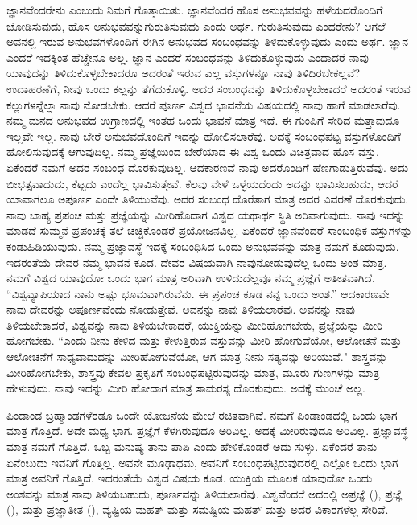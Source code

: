 ಜ್ಞಾನವೆಂದರೇನು ಎಂಬುದು ನಿಮಗೆ ಗೊತ್ತಾಯಿತು. ಜ್ಞಾನವೆಂದರೆ ಹೊಸ ಅನುಭವವನ್ನು ಹಳೆಯದರೊಂದಿಗೆ ಜೋಡಿಸುವುದು, ಹೊಸ ಅನುಭವವನ್ನು\break ಗುರುತಿಸುವುದು ಎಂದು ಅರ್ಥ. ಗುರುತಿಸುವುದು ಎಂದರೇನು? ಆಗಲೆ ಅವನಲ್ಲಿ ಇರುವ ಅನುಭವಗಳೊಂದಿಗೆ ಈಗಿನ ಅನುಭವದ ಸಂಬಂಧವನ್ನು ತಿಳಿದುಕೊಳ್ಳುವುದು ಎಂದು ಅರ್ಥ. ಜ್ಞಾನ ಎಂದರೆ ಇದಕ್ಕಿಂತ ಹೆಚ್ಚೇನೂ ಅಲ್ಲ. ಜ್ಞಾನ ಎಂದರೆ ಸಂಬಂಧವನ್ನು ತಿಳಿದುಕೊಳ್ಳುವುದು ಎಂದಾದರೆ ನಾವು ಯಾವುದನ್ನು ತಿಳಿದುಕೊಳ್ಳಬೇಕಾದರೂ ಅದರಂತೆ ಇರುವ ಎಲ್ಲ ವಸ್ತುಗಳನ್ನೂ ನಾವು ತಿಳಿದಿರಬೇಕಲ್ಲವೆ? ಉದಾಹರಣೆಗೆ, ನೀವು ಒಂದು ಕಲ್ಲನ್ನು ತೆಗೆದುಕೊಳ್ಳಿ. ಅದರ ಸಂಬಂಧವನ್ನು ತಿಳಿದುಕೊಳ್ಳಬೇಕಾದರೆ ಅದರಂತೆ ಇರುವ ಕಲ್ಲುಗಳನ್ನೆಲ್ಲಾ ನಾವು ನೋಡಬೇಕು. ಆದರೆ ಪೂರ್ಣ ವಿಶ್ವದ ಭಾವನೆಯ ವಿಷಯದಲ್ಲಿ ನಾವು ಹಾಗೆ ಮಾಡಲಾರೆವು. ನಮ್ಮ ಮನದ ಅನುಭವದ ಉಗ್ರಾಣದಲ್ಲಿ ಇಂತಹ ಒಂದು ಭಾವನೆ ಮಾತ್ರ ಇದೆ. ಈ ಗುಂಪಿಗೆ ಸೇರಿದ ಮತ್ತಾವುದೂ ಇಲ್ಲವೇ ಇಲ್ಲ. ನಾವು ಬೇರೆ ಅನುಭವದೊಂದಿಗೆ ಇದನ್ನು ಹೋಲಿಸಲಾರೆವು. ಅದಕ್ಕೆ ಸಂಬಂಧಪಟ್ಟ ವಸ್ತುಗಳೊಂದಿಗೆ ಹೋಲಿಸುವುದಕ್ಕೆ ಆಗುವುದಿಲ್ಲ. ನಮ್ಮ ಪ್ರಜ್ಞೆಯಿಂದ ಬೇರೆಯಾದ ಈ ವಿಶ್ವ ಒಂದು ವಿಚಿತ್ರವಾದ ಹೊಸ ವಸ್ತು. ಏಕೆಂದರೆ ನಮಗೆ ಅದರ ಸಂಬಂಧ ದೊರಕುವುದಿಲ್ಲ. ಆದಕಾರಣವೆ ನಾವು ಅದರೊಂದಿಗೆ ಹೆಣಗಾಡುತ್ತಿರುವೆವು. ಅದು ಬೀಭತ್ಸವಾದುದು, ಕೆಟ್ಟದು ಎಂದೆಲ್ಲ ಭಾವಿಸುತ್ತೇವೆ. ಕೆಲವು ವೇಳೆ ಒಳ್ಳೆಯದೆಂದು ಅದನ್ನು ಭಾವಿಸಬಹುದು, ಆದರೆ ಯಾವಾಗಲೂ ಅಪೂರ್ಣ ಎಂದೇ ತಿಳಿಯುವೆವು. ಅದರ ಸಂಬಂಧ ದೊರೆತಾಗ ಮಾತ್ರ ಅದರ ವಿವರಣೆ ದೊರಕುವುದು. ನಾವು ಬಾಹ್ಯ ಪ್ರಪಂಚ ಮತ್ತು ಪ್ರಜ್ಞೆಯನ್ನು ಮೀರಿಹೊದಾಗ ವಿಶ್ವದ ಯಥಾರ್ಥ ಸ್ಥಿತಿ ಅರಿವಾಗುವುದು. ನಾವು ಇದನ್ನು ಮಾಡದೆ ಸುಮ್ಮನೆ ಪ್ರಪಂಚಕ್ಕೆ ತಲೆ ಚಚ್ಚಿಕೊಂಡರೆ ಪ್ರಯೋಜನವಿಲ್ಲ. ಏಕೆಂದರೆ ಜ್ಞಾನವೆಂದರೆ ಸಾಂಬಂಧಿಕ ವಸ್ತುಗಳನ್ನು ಕಂಡುಹಿಡಿಯುವುದು. ನಮ್ಮ ಪ್ರಜ್ಞಾವಸ್ಥೆ ಇದಕ್ಕೆ ಸಂಬಂಧಿಸಿದ ಒಂದು ಅನುಭವವನ್ನು ಮಾತ್ರ ನಮಗೆ ಕೊಡುವುದು. ಇದರಂತೆಯೆ ದೇವರ ನಮ್ಮ ಭಾವನೆ ಕೂಡ. ದೇವರ ವಿಷಯವಾಗಿ ನಾವು\break ನೋಡುವುದೆಲ್ಲ ಒಂದು ಅಂಶ ಮಾತ್ರ. ನಮಗೆ ವಿಶ್ವದ ಯಾವುದೋ ಒಂದು ಭಾಗ ಮಾತ್ರ ಅರಿವಾಗಿ ಉಳಿದುದೆಲ್ಲವೂ ನಮ್ಮ ಪ್ರಜ್ಞೆಗೆ ಅತೀತವಾಗಿದೆ. “ವಿಶ್ವವ್ಯಾಪಿಯಾದ ನಾನು ಅಷ್ಟು ಭೂಮವಾಗಿರುವೆನು. ಈ ಪ್ರಪಂಚ ಕೂಡ ನನ್ನ ಒಂದು ಅಂಶ.'' ಆದಕಾರಣವೇ ನಾವು ದೇವರನ್ನು ಅಪೂರ್ಣವೆಂದು ನೋಡುತ್ತೇವೆ. ಅವನನ್ನು ನಾವು ತಿಳಿಯಲಾರೆವು. ಅವನನ್ನು ನಾವು ತಿಳಿಯಬೇಕಾದರೆ, ವಿಶ್ವವನ್ನು ನಾವು ತಿಳಿಯಬೇಕಾದರೆ, ಯುಕ್ತಿಯನ್ನು ಮೀರಿಹೋಗಬೇಕು, ಪ್ರಜ್ಞೆಯನ್ನು ಮೀರಿ ಹೋಗಬೇಕು. “ಎಂದು ನೀನು ಕೇಳಿದ ಮತ್ತು ಕೇಳುತ್ತಿರುವ ವಸ್ತುವನ್ನು ಮೀರಿ ಹೋಗುವೆಯೋ, ಆಲೋಚನೆ ಮತ್ತು ಆಲೋಚನೆಗೆ ಸಾಧ್ಯವಾದುದನ್ನು ಮೀರಿಹೋಗುವೆಯೋ, ಆಗ ಮಾತ್ರ ನೀನು ಸತ್ಯವನ್ನು ಅರಿಯುವೆ." ಶಾಸ್ತ್ರವನ್ನು ಮೀರಿಹೋಗಬೇಕು, ಶಾಸ್ತ್ರವು ಕೇವಲ ಪ್ರಕೃತಿಗೆ ಸಂಬಂಧಪಟ್ಟಿರುವುದನ್ನು ಮಾತ್ರ, ಮೂರು ಗುಣಗಳನ್ನು ಮಾತ್ರ ಹೇಳುವುದು. ನಾವು ಇದನ್ನು ಮೀರಿ ಹೋದಾಗ ಮಾತ್ರ ಸಾಮರಸ್ಯ ದೊರಕುವುದು. ಅದಕ್ಕೆ ಮುಂಚೆ ಅಲ್ಲ.

ಪಿಂಡಾಂಡ ಬ್ರಹ್ಮಾಂಡಗಳೆರಡೂ ಒಂದೇ ಯೋಜನೆಯ ಮೇಲೆ ರಚಿತವಾಗಿವೆ. ನಮಗೆ ಪಿಂಡಾಂಡದಲ್ಲಿ ಒಂದು ಭಾಗ ಮಾತ್ರ ಗೊತ್ತಿದೆ. ಅದೇ ಮಧ್ಯ ಭಾಗ. ಪ್ರಜ್ಞೆಗೆ ಕೆಳಗಿರುವುದೂ ಅರಿವಿಲ್ಲ, ಅದಕ್ಕೆ ಮೀರಿರುವುದೂ ಅರಿವಿಲ್ಲ. ಪ್ರಜ್ಞಾವಸ್ಥೆ ಮಾತ್ರ ನಮಗೆ ಗೊತ್ತಿದೆ. ಒಬ್ಬ ಮನುಷ್ಯ ತಾನು ಪಾಪಿ ಎಂದು ಹೇಳಿಕೊಂಡರೆ ಅದು ಸುಳ್ಳು. ಏಕೆಂದರೆ ತಾನು ಏನೆಂಬುದು ಇವನಿಗೆ ಗೊತ್ತಿಲ್ಲ. ಅವನೇ ಮೂಢಾಧಮ, ಅವನಿಗೆ ಸಂಬಂಧಪಟ್ಟಿರುವುದರಲ್ಲಿ ಎಲ್ಲೋ ಒಂದು ಭಾಗ ಮಾತ್ರ ಅವನಿಗೆ ಗೊತ್ತಿದೆ. ಇದರಂತೆಯೆ ವಿಶ್ವದ ವಿಷಯ ಕೂಡ. ಯುಕ್ತಿಯ ಮೂಲಕ ಯಾವುದೋ ಒಂದು ಅಂಶವನ್ನು ಮಾತ್ರ ನಾವು ತಿಳಿಯಬಹುದು, ಪೂರ್ಣವನ್ನು ತಿಳಿಯಲಾರೆವು. ವಿಶ್ವವೆಂದರೆ ಅದರಲ್ಲಿ ಅಪ್ರಜ್ಞೆ (), ಪ್ರಜ್ಞೆ (), ಮತ್ತು ಪ್ರಜ್ಞಾತೀತ (), ವ್ಯಷ್ಟಿಯ ಮಹತ್ ಮತ್ತು ಸಮಷ್ಟಿಯ ಮಹತ್ ಮತ್ತು ಅದರ ವಿಕಾರಗಳೆಲ್ಲ ಸೇರಿವೆ.

